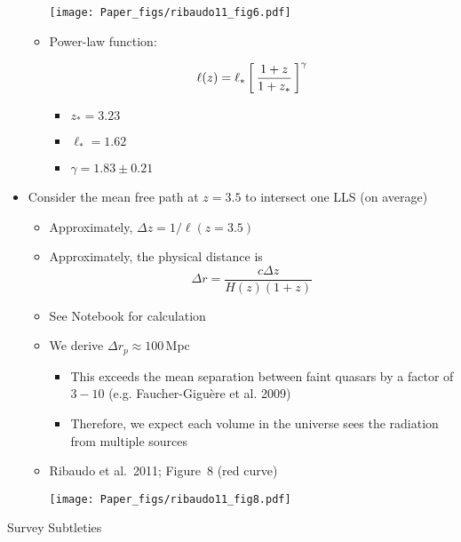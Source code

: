 \documentclass[12pt,letterpaper]{article}
\begin{document}
\begin{Aenumerate}
\begin{itemize}
\begin{itemize}
\texttt{[image: Paper\_figs/ribaudo11\_fig6.pdf]}

  	\item Power-law function:

  	\begin{equation}
  	\ell(z) = \ell_* \left [ \, \frac{1+z}{1+z_*} \, \right ]^\gamma
  	\label{eqn:lz}
  	\end{equation}
  		\begin{itemize}
  		\item $z_* = 3.23$
  		\item $\ell_* = 1.62$
  		\item $\gamma = 1.83 \pm 0.21$
  		\end{itemize}
  	\end{itemize}

 \item Consider the mean free path at $z=3.5$ to intersect one LLS (on average)
  	\begin{itemize}
  	\item Approximately, $\Delta z = 1 / \ell(z=3.5)$
  	\item Approximately, the physical distance is
  	\begin{equation}
  	\Delta r = \frac{c \Delta z}{H(z) (1+z)}
  	\end{equation}
  	\item See Notebook for calculation
  	\item We derive $\Delta r_p \approx 100$\,Mpc
  	  	\begin{itemize}
  	  	\item This exceeds the mean separation between faint
  		quasars by a factor of $3-10$ (e.g. Faucher-Gigu\`ere et al. 2009)
  		\item Therefore, we expect each volume in the universe sees
  		the radiation from multiple sources
  		\end{itemize}
  	\item Ribaudo et al.\ 2011;  Figure~8  (red curve)

\texttt{[image: Paper\_figs/ribaudo11\_fig8.pdf]}

  	\end{itemize}

  \end{itemize}

{\bf \item Survey Subtleties}
	\begin{itemize}


\end{itemize}
\end{Aenumerate}
\end{document}
